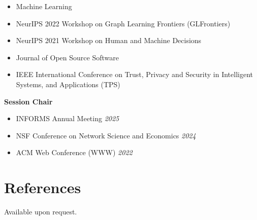 \documentclass[margin]{res}
\newcommand{\field}[2]{\noindent \textbf{#1} \hfill #2 \\}
\begin{document}
\begin{resume}
{\begin{itemize}[nosep]
		\item[--] Machine Learning
		\item[--] NeurIPS 2022 Workshop on Graph Learning Frontiers (GLFrontiers)
		\item[--] NeurIPS 2021 Workshop on Human and Machine Decisions 
		\item[--] Journal of Open Source Software
		\item[--] IEEE International Conference on Trust, Privacy and Security in Intelligent Systems, and Applications (TPS)
	\end{itemize}}
	\field{Session Chair}{}{
	\vspace{-2em} 
	\begin{itemize}[nosep]
		\item[--] INFORMS Annual Meeting \hfill \emph{2025}
		\item[--] NSF Conference on Network Science and Economics \hfill \emph{2024}
		\item[--] ACM Web Conference (WWW) \hfill \emph{2022}
		
	\end{itemize}}
	
\section{References} Available upon request.

\end{resume}
\end{document}

